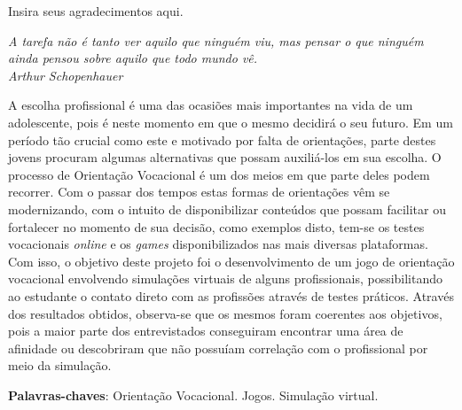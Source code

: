 \documentclass[
	12pt,				%
    oneside,			%
	a4paper,			%
	english,			%
	french,				%
	spanish,			%
	brazil,				%
	]{abntex2}
\begin{document}
\frenchspacing 


\imprimircapa

\imprimirfolhaderosto*






\begin{agradecimentos}
Insira seus agradecimentos aqui.
\end{agradecimentos}

\vspace*{\fill}
{ \raggedleft
	\textit{A tarefa não é tanto ver aquilo que ninguém viu, mas pensar o que ninguém ainda pensou sobre aquilo que todo mundo vê. \\
		Arthur Schopenhauer}
	~
}
\pagebreak


\begin{resumo} %
 
    A escolha profissional é uma das ocasiões mais importantes na vida de um adolescente, pois é neste momento em que o mesmo decidirá o seu futuro. Em um período tão crucial como este e motivado por falta de orientações, parte destes jovens procuram algumas alternativas que possam auxiliá-los em sua escolha. O processo de Orientação Vocacional é um dos meios em que parte deles podem recorrer. Com o passar dos tempos estas formas de orientações vêm se modernizando, com o intuito de disponibilizar conteúdos que possam facilitar ou fortalecer no momento de sua decisão, como exemplos disto, tem-se os testes vocacionais \textit{online} e os \textit{games} disponibilizados nas mais diversas plataformas. Com isso, o objetivo deste projeto foi o desenvolvimento de um jogo de orientação vocacional envolvendo simulações virtuais de alguns profissionais, possibilitando ao estudante o contato direto com as profissões através de testes práticos. Através dos resultados obtidos, observa-se que os mesmos foram coerentes aos objetivos, pois a maior parte dos entrevistados conseguiram encontrar uma área de afinidade ou descobriram que não possuíam correlação com o profissional por meio da simulação.
 

 \vspace{\onelineskip}
    
 \noindent
 \textbf{Palavras-chaves}: Orientação Vocacional. Jogos. Simulação virtual.
\end{resumo} %
\end{document}
